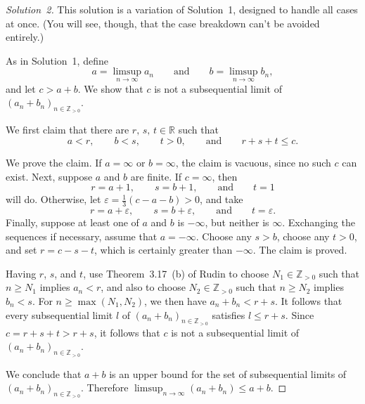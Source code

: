 \documentclass[10pt]{amsart}
\newcommand{\I}{\infty}
\newcommand{\ep}{\varepsilon}
\newcommand{\R}{{\mathbb{R}}}
\newcommand{\N}{{\mathbb{Z}}_{> 0}}
\newcommand{\A}{\qquad {\mbox{and}} \qquad}
\begin{document}
\vspace{1ex}

\begin{proof}[Solution~2]
This solution is a variation of Solution~1, designed to handle
all cases at once.
(You will see, though, that the case breakdown can't be avoided
entirely.)

As in  Solution~1, define
\[
a = \limsup_{n \to \I} a_n \A b = \limsup_{n \to \I} b_n,
\]
and let $c > a + b$.
We show that $c$ is not a subsequential limit
of $(a_n + b_n)_{n \in \N}$.

We first claim that there are $r, \, s, \, t \in \R$ such that
\[
a < r, \qquad b < s, \qquad t > 0, \A r + s + t \leq c.
\]

We prove the claim.
If $a = \I$ or $b = \I$, the claim is vacuous,
since no such $c$ can exist.
Next, suppose $a$ and $b$ are finite.
If $c = \I$, then
\[
r = a + 1, \qquad s = b + 1, \A t = 1
\]
will do.
Otherwise, let $\ep = \frac{1}{3} (c - a - b) > 0$, and take
\[
r = a + \ep, \qquad s = b + \ep, \A t = \ep.
\]
Finally, suppose at least one of $a$ and $b$ is $-\I$,
but neither is $\I$.
Exchanging the sequences if necessary, assume that $a = - \I$.
Choose any $s > b$, choose any $t > 0$, and set $r = c - s - t$,
which is certainly greater than $- \I$.
The claim is proved.

Having $r$, $s$, and $t$,
use Theorem~3.17~(b) of Rudin to choose $N_1 \in \N$ such that
$n \geq N_1$ implies $a_n < r$, and also to
choose $N_2 \in \N$ such that $n \geq N_2$ implies $b_n < s$.
For $n \geq \max (N_1, N_2)$, we then have
$a_n + b_n < r + s$.
It follows that every subsequential limit $l$ of
$(a_n + b_n)_{n \in \N}$ satisfies $l \leq r + s$.
Since $c = r + s + t > r + s$, it follows that
$c$ is not a subsequential limit of $(a_n + b_n)_{n \in \N}$.

We conclude that $a + b$ is an upper bound for the set of
subsequential limits of $(a_n + b_n)_{n \in \N}$.
Therefore $\limsup_{n \to \I} (a_n + b_n) \leq a + b$.
\end{proof}
\end{document}
